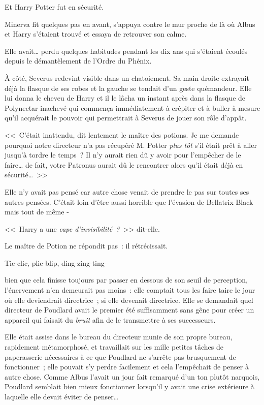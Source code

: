 Et Harry Potter fut en sécurité.

Minerva fit quelques pas en avant, s'appuya contre le mur proche de là où Albus et Harry s'étaient trouvé et essaya de retrouver son calme.

Elle avait… perdu quelques habitudes pendant les dix ans qui s'étaient écoulés depuis le démantèlement de l'Ordre du Phénix.

À côté, Severus redevint visible dans un chatoiement. Sa main droite extrayait déjà la flasque de ses robes et la gauche se tendait d'un geste quémandeur. Elle lui donna le cheveu de Harry et il le lâcha un instant après dans la flasque de Polynectar inachevé qui commença immédiatement à crépiter et à buller à mesure qu'il acquérait le pouvoir qui permettrait à Severus de jouer son rôle d'appât.

<<~C'était inattendu, dit lentement le maître des potions. Je me demande pourquoi notre directeur n'a pas récupéré M. Potter \emph{plus tôt} s'il était prêt à aller jusqu'à tordre le temps~? Il n'y aurait rien dû y avoir pour l'empêcher de le faire… de fait, votre Patronus aurait dû le rencontrer alors qu'il était déjà en sécurité…~>>

Elle n'y avait pas pensé car autre chose venait de prendre le pas sur toutes ses autres pensées. C'était loin d'être aussi horrible que l'évasion de Bellatrix Black mais tout de même -

<<~Harry a une \emph{cape d'invisibilité~?}~>> dit-elle.

Le maître de Potion ne répondit pas~: il rétrécissait.

\later

Tic-clic, plic-blip, ding-zing-ting-

bien que cela finisse toujours par passer en dessous de son seuil de perception, l'énervement n'en demeurait pas moins~: elle comptait tous les faire taire le jour où elle deviendrait directrice~; si elle devenait directrice. Elle se demandait quel directeur de Poudlard avait le premier été suffisamment sans gêne pour créer un appareil qui faisait du \emph{bruit} afin de le transmettre à ses successeurs.

Elle était assise dans le bureau du directeur munie de son propre bureau, rapidement métamorphosé, et travaillait sur les mille petites tâches de paperasserie nécessaires à ce que Poudlard ne s'arrête pas brusquement de fonctionner~; elle pouvait s'y perdre facilement et cela l'empêchait de penser à autre chose. Comme Albus l'avait un jour fait remarqué d'un ton plutôt narquois, Poudlard semblait bien mieux fonctionner lorsqu'il y avait une crise extérieure à laquelle elle devait éviter de penser…

